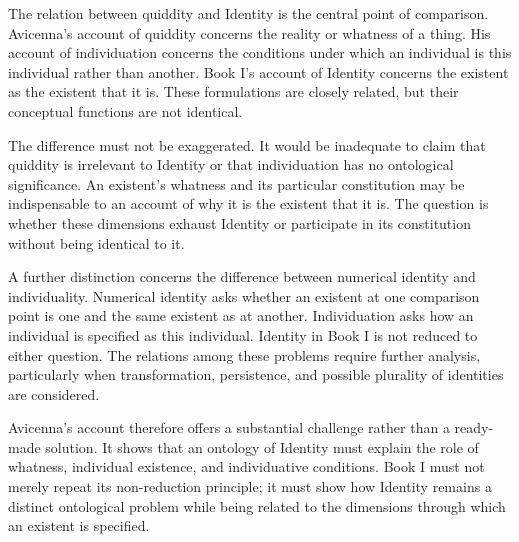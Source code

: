 The relation between
quiddity and Identity
is the central point
of comparison.
Avicenna's account
of quiddity concerns
the reality or
whatness of a thing.
His account of
individuation concerns
the conditions under
which an individual
is this individual
rather than another.
Book I's account
of Identity concerns
the existent as
the existent that
it is. These
formulations are
closely related,
but their conceptual
functions are not
identical.

\label{para:VS.B01.P01.C08.S13.SS13.P002}

The difference must
not be exaggerated.
It would be inadequate
to claim that
quiddity is irrelevant
to Identity or
that individuation
has no ontological
significance. An
existent's whatness
and its particular
constitution may
be indispensable
to an account
of why it is
the existent that
it is. The
question is whether
these dimensions
exhaust Identity
or participate
in its constitution
without being
identical to it.

\label{para:VS.B01.P01.C08.S13.SS13.P003}

A further distinction
concerns the difference
between numerical
identity and individuality.
Numerical identity
asks whether an
existent at one
comparison point
is one and the
same existent
as at another.
Individuation asks
how an individual
is specified
as this individual.
Identity in Book I
is not reduced
to either question.
The relations among
these problems
require further
analysis, particularly
when transformation,
persistence, and
possible plurality
of identities are
considered.

\label{para:VS.B01.P01.C08.S13.SS13.P004}

Avicenna's account
therefore offers
a substantial
challenge rather
than a ready-made
solution. It
shows that an
ontology of Identity
must explain
the role of
whatness, individual
existence, and
individuative
conditions. Book I
must not merely
repeat its
non-reduction
principle; it
must show how
Identity remains
a distinct
ontological problem
while being related
to the dimensions
through which
an existent
is specified.



